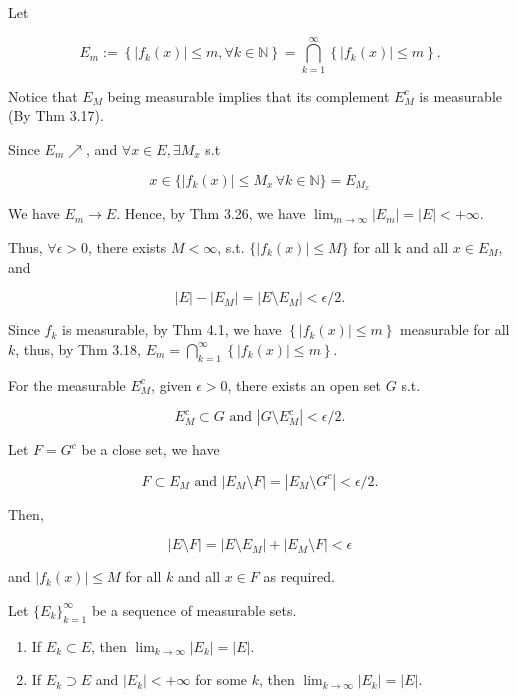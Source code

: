 \documentclass[UTF8,a4paper,10pt]{article}
\begin{document}
  Let 
  
  \[ E_m := \left\{ |f_k(x)| \leq m , \forall  k\in \mathbb{N} \right\} = \bigcap_{k=1}^{\infty} \left\{ |f_k(x)| \leq m\right\}.\]

  Notice that \(E_M\) being measurable implies that its complement \(E_M^c\) is measurable (By Thm 3.17).

  Since \(E_m\nearrow \), and \(\forall x\in E, \exists M_x\) s.t 

  \[x\in \{|f_k(x)|\leq M_x\, \forall k \in \mathbb{N} \} = E_{M_x}\]
  
  We have \(E_m\to E\). Hence, by Thm 3.26, we have \(\lim_{m\to\infty}|E_m| = |E| < +\infty\).



  Thus, \(\forall \epsilon > 0\), there exists \(M < \infty\), s.t. \(\{|f_k(x)|\leq M\}\) for all k and all \(x\in E_M\), and

  \[ |E| - |E_M| = |E \setminus E_M| < \epsilon/2.\]
  
  Since \(f_k\) is measurable, by Thm 4.1, we have \(\left\{ |f_k(x)| \leq m\right\}\) measurable for all \(k\), thus, by Thm 3.18, \( E_m = \bigcap_{k=1}^{\infty} \left\{ |f_k(x)| \leq m\right\}\).


  For the measurable \(E_M^c\), given \(\epsilon>0\), there exists an open set \(G\) s.t. 

  \[E_M^c \subset G \text{ and } |G \setminus E_M^c| < \epsilon/2.\]

  Let \(F = G^c\) be a close set, we have

  \[F \subset E_M \text{ and }  |E_M  \setminus  F| = |E_M  \setminus  G^c| < \epsilon/2.\]


  Then, 

  \[|E \setminus F| = |E \setminus E_M| + |E_M \setminus F| < \epsilon\]

  and $|f_k(x)| \leq M$ for all $k$ and all $x \in F$ as required.  


  
  \begin{mybox}{}
    
    \setcounter{section}{3}
    \setcounter{theorem}{25}
      \begin{theorem}
        Let $\{E_k\}_{k=1}^{\infty}$ be a sequence of measurable sets.
        \begin{enumerate}[label=(\roman*)]
          \item If $E_k \subset E$, then $\lim_{k\to\infty} |E_k| = |E|$.
          \item If $E_k \supset E$ and $|E_k| < +\infty$ for some $k$, then $\lim_{k\to\infty} |E_k| = |E|$.
        \end{enumerate}
        \end{theorem}
      \end{mybox}
\end{document}

